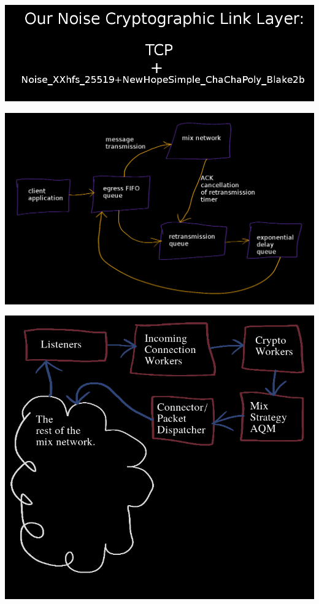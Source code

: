 \documentclass[fleqn,xcolor={usenames,dvipsnames}]{beamer} %
\begin{document}
\begin{frame}
\begin{center}
\includegraphics[scale=.33]{pics/noise_link_layer}
\end{center}
\end{frame}

\begin{frame}
\begin{center}
\includegraphics[scale=.24]{pics/client_aqms}
\end{center}
\end{frame}

\begin{frame}
\begin{center}
\includegraphics[scale=.33]{pics/mix_aqm_pipeline1}
\end{center}
\end{frame}
\end{document}
